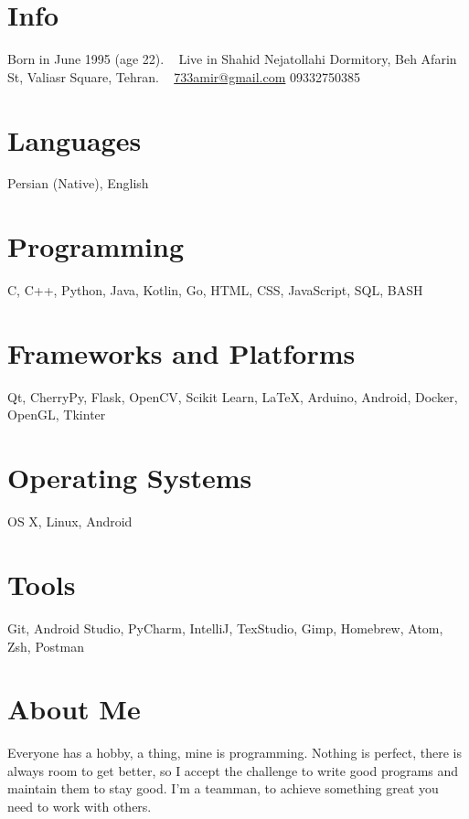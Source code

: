 \documentclass[]{friggeri-cv}
\begin{document}


\begin{aside}	
  \section{Info}
    Born in June 1995 (age 22).
    ~
    Live in Shahid Nejatollahi Dormitory, Beh Afarin St, Valiasr Square, Tehran.
    ~
    \href{mailto:733amir@gmail.com}{733amir@gmail.com}
    09332750385
  \section{Languages}
    Persian (Native),
    English
  \section{Programming}
	C, C++, Python, Java, Kotlin, Go, HTML, CSS, JavaScript, SQL, BASH
  \section{Frameworks and Platforms}
    Qt, CherryPy, Flask, OpenCV, Scikit Learn, LaTeX, Arduino, Android, Docker, OpenGL, Tkinter
  \section{Operating Systems}
  OS X, Linux, Android
  \section{Tools}
  Git, Android Studio, PyCharm, IntelliJ, TexStudio, Gimp, Homebrew, Atom, Zsh, Postman
\end{aside}

\section{About Me}


Everyone has a hobby, a thing, mine is programming. Nothing is perfect, there is always room to get better, so I accept the challenge to write good programs and maintain them to stay good. I'm a teamman, to achieve something great you need to work with others.
\end{document}
